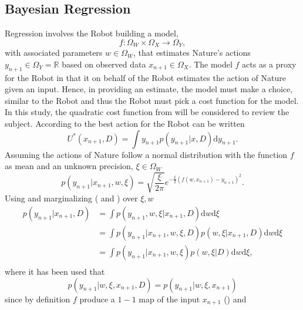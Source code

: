 \subsection{Bayesian Regression}
\label{chp:regression}
Regression involves the Robot building a model,
\begin{equation}
	f: \Omega_W\times \Omega_X\to\Omega_Y,
\end{equation} 
with associated parameters $w\in \Omega_W$, that estimates Nature's actions $y_{n+1}\in \Omega_Y=\mathbb{R}$ based on observed data $x_{n+1}\in \Omega_X$. The model $f$ acts as a proxy for the Robot in that it on behalf of the Robot estimates the action of Nature given an input. Hence, in providing an estimate, the model must make a choice, similar to the Robot and thus the Robot must pick a cost function for the model. In this study, the quadratic cost function from  will be considered to review the subject. According to  the best action for the Robot can be written
\begin{equation}
	U^*(x_{n+1},D) = \int y_{n+1} p(y_{n+1}|x,D) \mathrm{d}y_{n+1}.
	\label{eq:q1}
\end{equation}
Assuming the actions of Nature follow a normal distribution with the function $f$ as mean and an unknown precision, $\xi\in \Omega_W$
\begin{equation}
	p(y_{n+1}|x_{n+1},w,\xi)=\sqrt{\frac{\xi}{2\pi}} e^{-\frac{\xi}{2}(f(w,x_{n+1})-y_{n+1})^2}.
	\label{f_dist}
\end{equation}
Using  and marginalizing ( and ) over $\xi,w$
\begin{equation}
	\begin{split}
		p(y_{n+1}|x_{n+1},D) &= \int  p(y_{n+1},w,\xi|x_{n+1},D) \mathrm{d}w \mathrm{d}\xi\\
		& = \int  p(y_{n+1}|x_{n+1},w,\xi,D)  p(w,\xi|x_{n+1},D)\mathrm{d}w \mathrm{d}\xi\\
		& = \int  p(y_{n+1}|x_{n+1},w,\xi)  p(w,\xi|D) \mathrm{d}w \mathrm{d}\xi,\\
	\end{split}
	\label{eq:q2}
\end{equation}
where it has been used that 
\begin{equation}
	p(y_{n+1}|w,\xi,x_{n+1},D) = p(y_{n+1}|w,\xi,x_{n+1})
\end{equation}
since by definition $f$ produce a $1-1$ map of the input $x_{n+1}$ () and 
